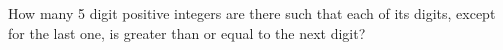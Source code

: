 How many 5 digit positive integers are there such that each of its digits, except for the last one, is greater than or equal to the next digit?